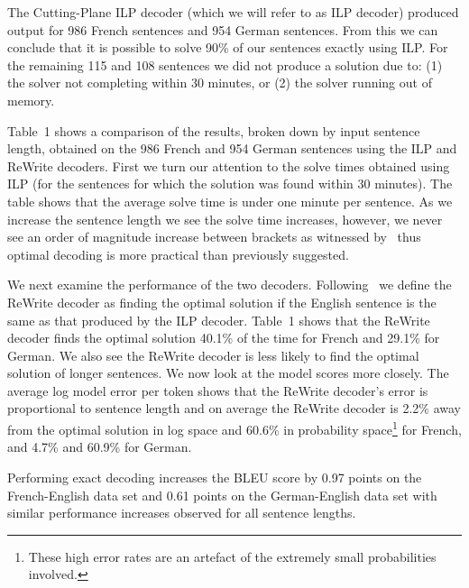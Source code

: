 The Cutting-Plane ILP decoder (which we will refer to as ILP decoder)
produced output for 986 French sentences and 954 German sentences.
From this we can conclude that it is possible to solve 90\% of our
sentences exactly using ILP.  For the remaining 115 and 108 sentences
we did not produce a solution due to: (1) the solver not completing
within 30 minutes, or (2) the solver running out of memory.


Table~1 shows a comparison of the results, broken down by input
sentence length, obtained on the 986 French and 954 German sentences
using the ILP and ReWrite decoders.  First we turn our attention to
the solve times obtained using ILP (for the sentences for which the
solution was found within 30 minutes).  The table shows that the
average solve time is under one minute per sentence.  As we increase
the sentence length we see the solve time increases, however, we never
see an order of magnitude increase between brackets as witnessed
by~\cite{GermannFast04} thus optimal decoding is more practical than
previously suggested.

We next examine the performance of the two decoders.
Following~\cite{GermannFast04} we define the ReWrite decoder as
finding the optimal solution if the English sentence is the same as
that produced by the ILP decoder.  Table~1 shows that the ReWrite
decoder finds the optimal solution 40.1\% of the time for French and
29.1\% for German.  We also see the ReWrite decoder is less likely to
find the optimal solution of longer sentences.  We now look at the
model scores more closely. The average log model error per token shows
that the ReWrite decoder's error is proportional to sentence length
and on average the ReWrite decoder is 2.2\% away from the optimal
solution in log space and 60.6\% in probability space\footnote{These
  high error rates are an artefact of the extremely small
  probabilities involved.} for French, and 4.7\% and 60.9\% for
German.

Performing exact decoding increases the BLEU score by 0.97 points on
the French-English data set and 0.61 points on the German-English data
set with similar performance increases observed for all sentence
lengths.

